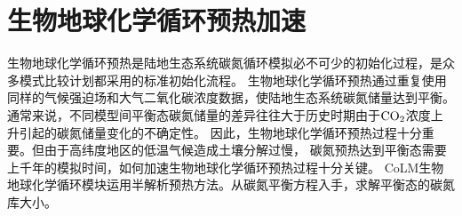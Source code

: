\chapter{生物地球化学循环预热加速}\label{生物地球化学循环预热加速}

生物地球化学循环预热是陆地生态系统碳氮循环模拟必不可少的初始化过程，是众多模式比较计划都采用的标准初始化流程。
生物地球化学循环预热通过重复使用同样的气候强迫场和大气二氧化碳浓度数据，使陆地生态系统碳氮储量达到平衡。
通常来说，不同模型间平衡态碳氮储量的差异往往大于历史时期由于$\rm CO_2$浓度上升引起的碳氮储量变化的不确定性。
因此，生物地球化学循环预热过程十分重要。但由于高纬度地区的低温气候造成土壤分解过慢，
碳氮预热达到平衡态需要上千年的模拟时间，如何加速生物地球化学循环预热过程十分关键。
CoLM生物地球化学循环模块运用半解析预热方法\citep{xia2012semi}。从碳氮平衡方程入手，求解平衡态的碳氮库大小。


